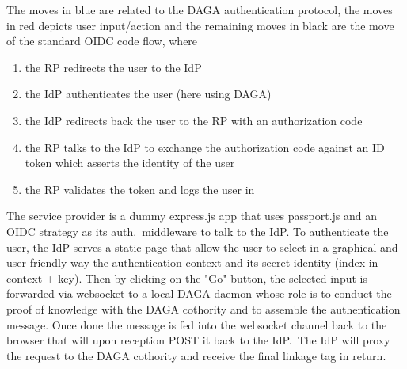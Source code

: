     The moves in blue are related to the DAGA authentication protocol, the moves in red depicts user input/action and the remaining
    moves in black are the move of the standard OIDC code flow, where \begin{enumerate}
                \item the RP redirects the user to the IdP
                \item the IdP authenticates the user (here using DAGA)
                \item the IdP redirects back the user to the RP with an authorization code
                \item the RP talks to the IdP to  exchange the authorization code against an ID token which asserts the identity of the user
                \item the RP validates the token and logs the user in
    \end{enumerate}

    The service provider is a dummy express.js app that uses passport.js and an OIDC strategy as its auth.\ middleware to talk to the IdP.\@
    To authenticate the user, the IdP serves a static page that allow the user to select in a graphical and user-friendly way
    the authentication context and its secret identity (index in context + key).
    Then by clicking on the "Go" button, the selected input is forwarded via websocket to a local DAGA daemon whose role is to conduct the proof of knowledge with the DAGA cothority and to assemble the authentication message.
    Once done the message is fed into the websocket channel back to the browser that will upon reception POST it back to the IdP.\
    The IdP will proxy the request to the DAGA cothority and receive the final linkage tag in return.



